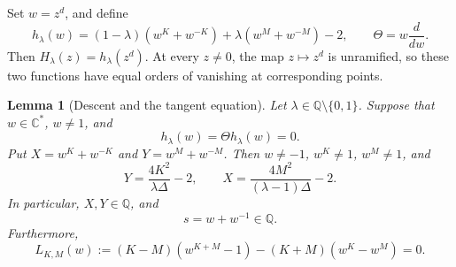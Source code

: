 \documentclass[11pt,a4paper]{article}
\newtheorem{lemma}[theorem]{Lemma}
\theoremstyle{definition}
\theoremstyle{remark}
\begin{document}
Set \(w=z^d\), and define
\begin{equation}\label{iw:h}
 h_\lambda(w)
 =(1-\lambda)(w^K+w^{-K})
     +\lambda(w^M+w^{-M})-2,
 \qquad \Theta=w\frac{d}{dw}.
\end{equation}
Then \(H_\lambda(z)=h_\lambda(z^d)\). At every \(z\ne0\), the map
\(z\mapsto z^d\) is unramified, so these two functions have equal
orders of vanishing at corresponding points.

\begin{lemma}[Descent and the tangent equation]\label{iw:descent}
Let \(\lambda\in\mathbb Q\setminus\{0,1\}\). Suppose that
\(w\in\mathbb C^*\), \(w\ne1\), and
\begin{equation}\label{iw:multiple-h}
 h_\lambda(w)=\Theta h_\lambda(w)=0.
\end{equation}
Put \(X=w^K+w^{-K}\) and \(Y=w^M+w^{-M}\). Then \(w\ne-1\),
\(w^K\ne1\), \(w^M\ne1\), and
\begin{equation}\label{iw:branch-values}
 Y=\frac{4K^2}{\lambda\Delta}-2,\qquad
 X=\frac{4M^2}{(\lambda-1)\Delta}-2.
\end{equation}
In particular, \(X,Y\in\mathbb Q\), and
\begin{equation}\label{iw:rational-trace}
 s=w+w^{-1}\in\mathbb Q.
\end{equation}
Furthermore,
\begin{equation}\label{iw:L}
 L_{K,M}(w):=
 (K-M)(w^{K+M}-1)-(K+M)(w^K-w^M)=0.
\end{equation}
\end{lemma}
\end{document}
